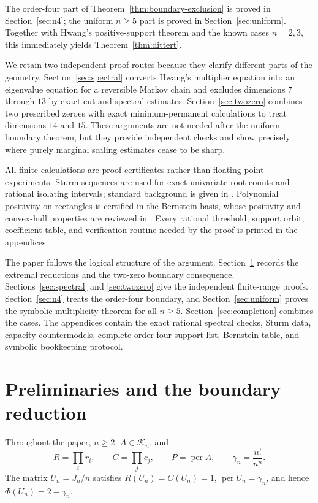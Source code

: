 \documentclass[10pt,a4paper]{amsart}
\theoremstyle{definition}
\theoremstyle{remark}
\begin{document}
The order-four part of Theorem~\ref{thm:boundary-exclusion} is proved in
Section~\ref{sec:n4}; the uniform \(n\geq5\) part is proved in
Section~\ref{sec:uniform}.  Together with Hwang's positive-support theorem
and the known cases \(n=2,3\), this immediately yields
Theorem~\ref{thm:dittert}.

We retain two independent proof routes because they clarify different
parts of the geometry.  Section~\ref{sec:spectral} converts Hwang's
multiplier equation into an eigenvalue equation for a reversible Markov
chain and excludes dimensions \(7\) through \(13\) by exact cut and
spectral estimates.  Section~\ref{sec:twozero} combines two prescribed
zeroes with exact minimum-permanent calculations to treat dimensions
\(14\) and \(15\).  These arguments are not needed after the uniform
boundary theorem, but they provide independent checks and show precisely
where purely marginal scaling estimates cease to be sharp.

All finite calculations are proof certificates rather than floating-point
experiments.  Sturm sequences are used for exact univariate root counts
and rational isolating intervals; standard background is given in
\cite{BasuPollackRoy}.  Polynomial positivity on rectangles is certified
in the Bernstein basis, whose positivity and convex-hull properties are
reviewed in \cite{Farouki}.  Every rational threshold, support orbit,
coefficient table, and verification routine needed by the proof is printed
in the appendices.

The paper follows the logical structure of the argument.
Section~\ref{sec:prelim} records the extremal reductions and the two-zero
boundary consequence.  Sections~\ref{sec:spectral} and
\ref{sec:twozero} give the independent finite-range proofs.
Section~\ref{sec:n4} treats the order-four boundary, and
Section~\ref{sec:uniform} proves the symbolic multiplicity theorem for all
\(n\geq5\).  Section~\ref{sec:completion} combines the cases.  The
appendices contain the exact rational spectral checks, Sturm data,
capacity countermodels, complete order-four support list, Bernstein table,
and symbolic bookkeeping protocol.

\section{Preliminaries and the boundary reduction}\label{sec:prelim}

Throughout the paper, \(n\geq2\), \(A\in\mathcal K_n\), and
\[
 R=\prod_i r_i,\qquad C=\prod_j c_j,\qquad
 P=\operatorname{per}A,\qquad
 \gamma_n=\frac{n!}{n^n}.
\]
The matrix \(U_n=J_n/n\) satisfies
\(R(U_n)=C(U_n)=1\), \(\operatorname{per}U_n=\gamma_n\), and hence
\(\Phi(U_n)=2-\gamma_n\).
\end{document}
